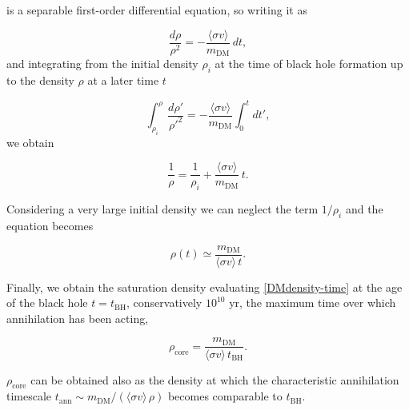  is a separable first-order differential equation, so writing it as

\begin{equation}
    \frac{d\rho}{\rho^2} = -\frac{\langle\sigma v\rangle}{m_{\mathrm{DM}}}\, dt,
\end{equation}
and integrating from the initial density $\rho_i$ at the time of
black hole formation up to the density $\rho$ at a later time $t$

\begin{equation}
    \int_{\rho_i}^{\rho} \frac{d\rho'}{\rho'^2}
    = -\frac{\langle\sigma v\rangle}{m_{\mathrm{DM}}}\int_0^t dt',
\end{equation}
we obtain 

\begin{equation}
    \frac{1}{\rho} = \frac{1}{\rho_i} + \frac{\langle\sigma v\rangle}{m_{\mathrm{DM}}}\, t.
    \label{eq:app_solution}
\end{equation}

Considering a very large initial density we can neglect the term $1/\rho_i$ and the equation becomes

\begin{equation} \label{DMdensity-time}
    \rho(t) \simeq \frac{m_{\mathrm{DM}}}{\langle\sigma v\rangle\, t}.
\end{equation}

Finally, we obtain the saturation density evaluating \cref{DMdensity-time} at the age of the black hole $t = t_{\mathrm{BH}}$, conservatively $10^{10}$ yr,
the maximum time over which annihilation has been acting,

\begin{equation}
    \rho_{\mathrm{core}} = \frac{m_{\mathrm{DM}}}{\langle\sigma v\rangle\, t_{\mathrm{BH}}}.
\end{equation}

$\rho_{\mathrm{core}}$ can be obtained also as the density at which the
characteristic annihilation timescale
$t_{\mathrm{ann}} \sim m_{\mathrm{DM}}/(\langle\sigma v\rangle\,\rho)$ becomes comparable to
$t_{\mathrm{BH}}$.
